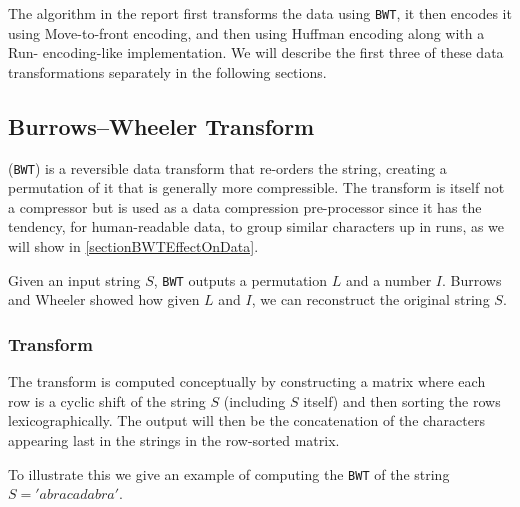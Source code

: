 \documentclass{article}
\begin{document}
The algorithm in the report first transforms the data using \texttt{BWT}, it then encodes it using Move-to-front encoding, and then using Huffman encoding along with a Run-  encoding-like implementation. We will describe the first three of these data transformations separately in the following sections.

\subsection{Burrows--Wheeler Transform}
(\texttt{BWT}) is a reversible data transform that re-orders the string, creating a permutation of it that is generally more compressible. The transform is itself not a compressor but is used as a data compression pre-processor since it has the tendency, for human-readable data, to group similar characters up in runs, as we will show in \cref{sectionBWTEffectOnData}.

Given an input string \(S\), \texttt{BWT} outputs a permutation \(L\) and a number \(I\). Burrows and Wheeler showed how given \(L\) and \(I\), we can reconstruct the original string \(S\). 

\subsubsection{Transform}
The transform is computed conceptually by constructing a matrix where each row is a cyclic shift of the string \(S\) (including \(S\) itself) and then sorting the rows lexicographically. The output will then be the concatenation of the characters appearing last in the strings in the row-sorted matrix.

To illustrate this we give an example of computing the \texttt{BWT} of the string \(S = 'abracadabra'\).
\end{document}
